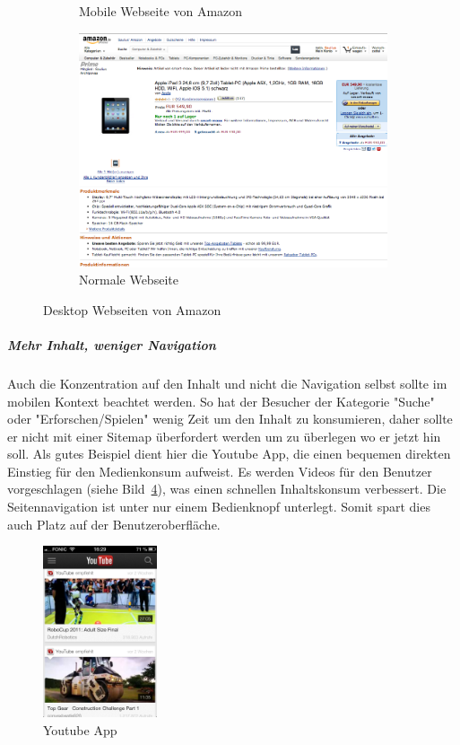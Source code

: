 \begin{figure}
\begin{subfigure}[b]{0.3\textwidth}
		\caption{Mobile Webseite von Amazon}\label{fig:amazon}
	\end{subfigure}
	\begin{subfigure}[b]{0.6\textwidth}
		\centering
		\includegraphics[width=1\textwidth]{img/amazonFull.png}
		\caption{Normale Webseite}\label{fig:amazonFull}
	\end{subfigure}
	\caption{Desktop Webseiten von Amazon}\label{fig:amazonSites}
\end{figure}

\subparagraph{Mehr Inhalt, weniger Navigation} 
\label{subp:entferne_das_fett} 

Auch die Konzentration auf den Inhalt und nicht die Navigation selbst sollte im mobilen Kontext beachtet werden\cite[Seite 52]{mobileFirst}. So hat der Besucher der Kategorie "Suche" oder "Erforschen/Spielen"  wenig Zeit um den Inhalt zu konsumieren, daher sollte er nicht mit einer Sitemap überfordert werden um zu überlegen wo er jetzt hin soll. Als gutes Beispiel dient hier die Youtube App, die einen bequemen direkten Einstieg für den Medienkonsum aufweist. Es werden Videos für den Benutzer vorgeschlagen (siehe Bild~\ref{fig:youtube}), was einen schnellen Inhaltskonsum verbessert. Die Seitennavigation ist unter nur einem Bedienknopf unterlegt. Somit spart dies auch Platz auf der Benutzeroberfläche.

\begin{figure}
	\begin{center}
	\includegraphics[width=0.3\textwidth]{img/youtube.png}
	\caption{Youtube App}\label{fig:youtube}
\end{center}
\end{figure}

